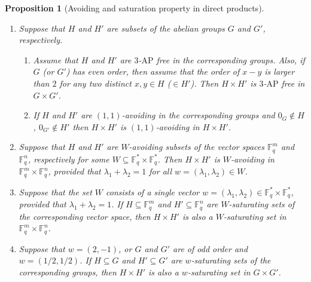 \documentclass[11pt]{article}
\numberwithin{table}{section}
\newcommand{\F}{{\mathbb F}}
\newtheorem{prop}[theorem]{\bf Proposition}
\theoremstyle{definition}
\begin{document}
	
	\begin{prop}[Avoiding and saturation property in direct products]\label{product}
		\ \\ \vspace{-0.5cm}
		\begin{enumerate}[\rm(1)]
			\item Suppose that $H$ and $H'$ are subsets of the abelian groups $G$ and $G'$, respectively.
			\begin{enumerate}
				\item 
				Assume that $H$ and $H'$ are $3$-$\mathrm{AP}$ free in the corresponding groups. Also, if $G$ (or $G'$) has even order, then assume  that the order of $x-y$ is larger than $2$ for any two distinct $x,y\in H$ ($\in H'$). 
				Then $H\times H'$ is $3$-$\mathrm{AP}$ free in $G \times G'$.
				\item If $H$ and $H'$ are $(1,1)$-avoiding in the corresponding groups and $0_G \notin H$, $0_{G'}\notin H'$ then $H\times H'$ is $(1,1)$-avoiding in $H \times H'$.
			\end{enumerate}
			
			
			\item  Suppose that $H$ and $H'$ are $W$-avoiding subsets of the vector spaces $\F_q^m$ and $\F_q^n$, respectively for some $W \subseteq \F_q^*\times \F_q^*$.  Then $H\times H'$ is $W$-avoiding in $\F_q^m \times \F_q^n$, provided that $\lambda_1+\lambda_2=1$ for all $w=(\lambda_1, \lambda_2)\in W$.
			
			\item Suppose that the set $W$  consists of a single vector $w=(\lambda_1, \lambda_2) \in \F_q^*\times \F_q^*$, provided that $\lambda_1+\lambda_2=1$. If $H\subseteq \F_q^m$ and $H'\subseteq \F_q^n$ are $W$-saturating sets of the corresponding vector space, then $H\times H'$ is also a $W$-saturating set in $ \F_q^{m}\times \F_q^n$.
			\item Suppose that $w=(2,-1)$, or $G$ and $G'$ are of odd order and $w=(1/2,1/2)$. If $H\subseteq G$ and $H'\subseteq G'$ are $w$-saturating sets of the corresponding groups, then $H\times H'$ is also a $w$-saturating set in $G \times G'$.
		\end{enumerate}
	\end{prop} %
	
\end{document}
